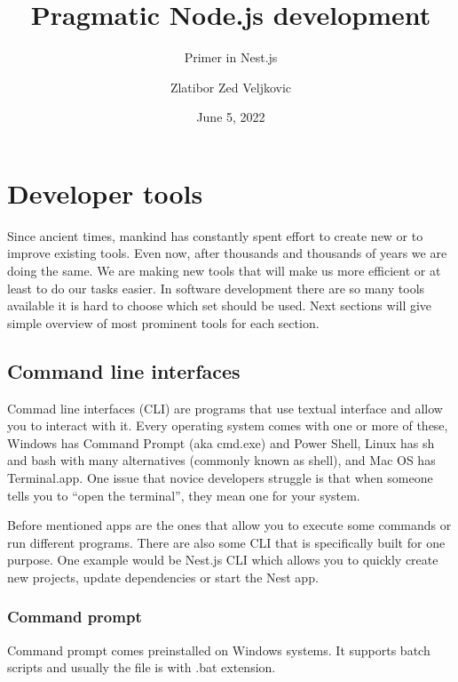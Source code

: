 \documentclass[lang=en,color=green]{elegantbook}
\title{Pragmatic Node.js development}
\subtitle{Primer in Nest.js}
\author{Zlatibor Zed Veljkovic}
\date{June 5, 2022}
\begin{document}
\maketitle
\frontmatter

\tableofcontents

\mainmatter

\chapter{Developer tools}

Since ancient times, mankind has constantly spent effort to create new or to improve existing tools. 
Even now, after thousands and thousands of years we are doing the same. 
We are making new tools that will make us more efficient or at least to do our tasks easier.
In software development there are so many tools available it is hard to choose which set should be used. Next sections will give simple overview of most prominent tools for each section. 


\section{Command line interfaces}
Commad line interfaces (CLI) are programs that use textual interface and allow you to interact with it. 
Every operating system comes with one or more of these, Windows has Command Prompt (aka cmd.exe) and Power Shell,
Linux has sh and bash with many alternatives (commonly known as shell), and Mac OS has Terminal.app. 
One issue that novice developers struggle is that when someone tells you to “open the terminal”,
they mean one for your system. 

Before mentioned apps are the ones that allow you to execute some commands or run different programs.
There are also some CLI that is specifically built for one purpose. 
One example would be Nest.js CLI which allows you to quickly create new projects,
 update dependencies or start the Nest app. 

\subsection{Command prompt} 
Command prompt comes preinstalled on Windows systems.
It supports batch scripts and usually the file is with .bat extension.
\end{document}
